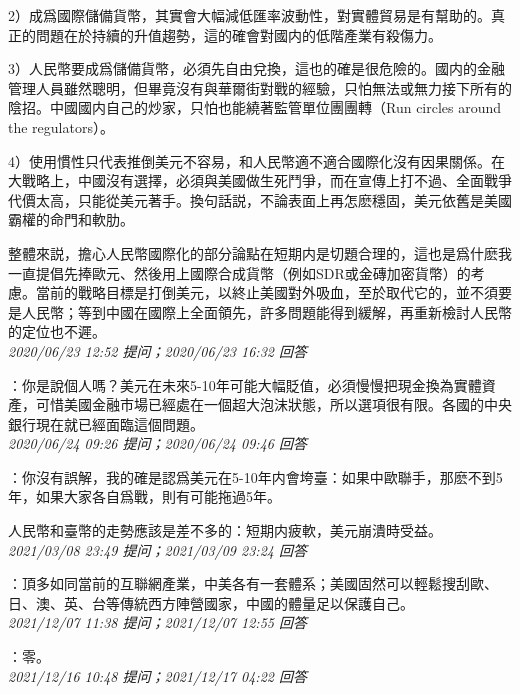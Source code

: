\documentclass[twocolumn]{ctexart}
\begin{document}
2）成爲國際儲備貨幣，其實會大幅減低匯率波動性，對實體貿易是有幫助的。真正的問題在於持續的升值趨勢，這的確會對國内的低階產業有殺傷力。

3）人民幣要成爲儲備貨幣，必須先自由兌換，這也的確是很危險的。國内的金融管理人員雖然聰明，但畢竟沒有與華爾街對戰的經驗，只怕無法或無力接下所有的陰招。中國國内自己的炒家，只怕也能繞著監管單位團團轉（Run circles around the regulators）。

4）使用慣性只代表推倒美元不容易，和人民幣適不適合國際化沒有因果關係。在大戰略上，中國沒有選擇，必須與美國做生死鬥爭，而在宣傳上打不過、全面戰爭代價太高，只能從美元著手。換句話説，不論表面上再怎麽穩固，美元依舊是美國霸權的命門和軟肋。

整體來説，擔心人民幣國際化的部分論點在短期内是切題合理的，這也是爲什麽我一直提倡先捧歐元、然後用上國際合成貨幣（例如SDR或金磚加密貨幣）的考慮。當前的戰略目標是打倒美元，以終止美國對外吸血，至於取代它的，並不須要是人民幣；等到中國在國際上全面領先，許多問題能得到緩解，再重新檢討人民幣的定位也不遲。
\\

\textit{\hfill\noindent\small 2020/06/23 12:52 提问；2020/06/23 16:32 回答}

：你是說個人嗎？美元在未來5-10年可能大幅貶值，必須慢慢把現金換為實體資產，可惜美國金融市場已經處在一個超大泡沫狀態，所以選項很有限。各國的中央銀行現在就已經面臨這個問題。
\\

\textit{\hfill\noindent\small 2020/06/24 09:26 提问；2020/06/24 09:46 回答}

：你沒有誤解，我的確是認爲美元在5-10年内會垮臺：如果中歐聯手，那麽不到5年，如果大家各自爲戰，則有可能拖過5年。

人民幣和臺幣的走勢應該是差不多的：短期内疲軟，美元崩潰時受益。
\\

\textit{\hfill\noindent\small 2021/03/08 23:49 提问；2021/03/09 23:24 回答}

：頂多如同當前的互聯網產業，中美各有一套體系；美國固然可以輕鬆搜刮歐、日、澳、英、台等傳統西方陣營國家，中國的體量足以保護自己。
\\

\textit{\hfill\noindent\small 2021/12/07 11:38 提问；2021/12/07 12:55 回答}

：零。
\\

\textit{\hfill\noindent\small 2021/12/16 10:48 提问；2021/12/17 04:22 回答}
\end{document}
